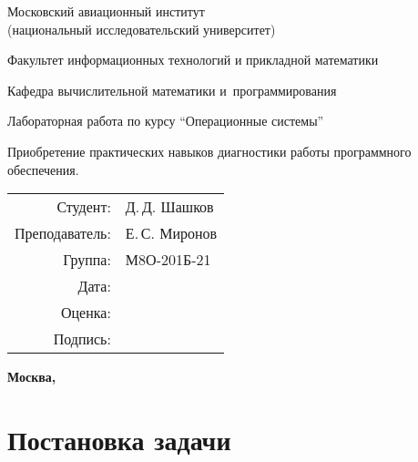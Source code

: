 \documentclass[pdf, unicode, 12pt, a4paper,oneside,fleqn]{article}
\begin{document}
\begin{titlepage}
    \begin{center}
        \bfseries

        {\Large Московский авиационный институт\\ (национальный исследовательский университет)}
        
        \vspace{48pt}
        
        {\large Факультет информационных технологий и прикладной математики}
        
        \vspace{36pt}
        
        {\large Кафедра вычислительной математики и~программирования}
        
        \vspace{48pt}
        
        Лабораторная работа  по курсу \enquote{Операционные системы}

        \vspace{48pt}

        Приобретение практических навыков диагностики работы программного обеспечения.
    \end{center}
    
    \vspace{150pt}
    
    \begin{flushright}
    \begin{tabular}{rl}
    Студент: & Д.\,Д. Шашков \\
    Преподаватель: & Е.\,С. Миронов \\
    Группа: & М8О-201Б-21 \\
    Дата: & \\
    Оценка: & \\
    Подпись: & \\
    \end{tabular}
    \end{flushright}
    
    \vfill
    
    \begin{center}
    \bfseries
    Москва, \the\year
    \end{center}
\end{titlepage}
    
\pagebreak

\section{Постановка задачи}
\end{document}
